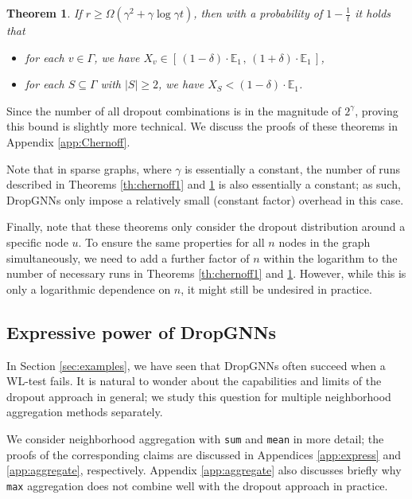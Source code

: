 \documentclass{article}
\newtheorem{theorem}{Theorem}
\begin{document}
\begin{theorem} \label{th:chernoff2}
If $r \geq \Omega \left( \gamma^2 + \gamma \log \gamma t \right)$, then with a probability of $1-\frac{1}{t}$ it holds that 
\begin{itemize}
\setlength\itemsep{0.8pt}
 \item for each $v \in \Gamma$, we have $X_v \in [\,(1\!-\!\delta) \cdot \mathbb{E}_{1\,} , \, (1\!+\!\delta) \cdot \mathbb{E}_1\, ]$,
 \item for each $S \subseteq \Gamma$ with $|S| \geq 2$, we have $X_S < (1\!-\!\delta) \cdot \mathbb{E}_1$.
\end{itemize}
\end{theorem}

Since the number of all dropout combinations is in the magnitude of $2^{\gamma}$, proving this bound is slightly more technical. We discuss the proofs of these theorems in Appendix \ref{app:Chernoff}.

Note that in sparse graphs, where $\gamma$ is essentially a constant, the number of runs described in Theorems \ref{th:chernoff1} and \ref{th:chernoff2} is also essentially a constant; as such, DropGNNs only impose a relatively small (constant factor) overhead in this case.

Finally, note that these theorems only consider the dropout distribution around a specific node $u$. To ensure the same properties for all $n$ nodes in the graph simultaneously, we need to add a further factor of $n$ within the logarithm to the number of necessary runs in Theorems \ref{th:chernoff1} and \ref{th:chernoff2}. However, while this is only a logarithmic dependence on $n$, it might still be undesired in practice.

\subsection{Expressive power of DropGNNs} \label{sec:power}

In Section \ref{sec:examples}, we have seen that DropGNNs often succeed when a WL-test fails. It is natural to wonder about the capabilities and limits of the dropout approach in general; we study this question for multiple neighborhood aggregation methods separately.

We consider neighborhood aggregation with \texttt{sum} and \texttt{mean} in more detail; the proofs of the corresponding claims are discussed in Appendices \ref{app:express} and \ref{app:aggregate}, respectively. Appendix \ref{app:aggregate} also discusses briefly why \texttt{max} aggregation does not combine well with the dropout approach in practice.
\end{document}
